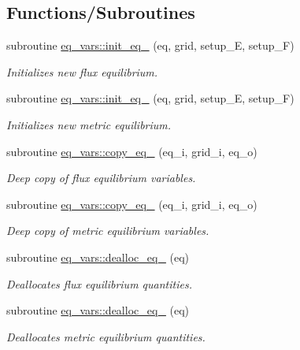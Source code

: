 \subsection*{Functions/\+Subroutines}
\begin{DoxyCompactItemize}
\item 
subroutine \hyperlink{namespaceeq__vars_a0270785c6b513c53e6d7c837f38f377b}{eq\+\_\+vars\+::init\+\_\+eq\+\_} (eq, grid, setup\+\_\+E, setup\+\_\+F)
\begin{DoxyCompactList}\small\item\em Initializes new flux equilibrium. \end{DoxyCompactList}\item 
subroutine \hyperlink{namespaceeq__vars_a93947b772250ef73b25bde7688b33bc2}{eq\+\_\+vars\+::init\+\_\+eq\+\_} (eq, grid, setup\+\_\+E, setup\+\_\+F)
\begin{DoxyCompactList}\small\item\em Initializes new metric equilibrium. \end{DoxyCompactList}\item 
subroutine \hyperlink{namespaceeq__vars_aa781ffa18b6b17905e126871c43d3267}{eq\+\_\+vars\+::copy\+\_\+eq\+\_} (eq\+\_\+i, grid\+\_\+i, eq\+\_\+o)
\begin{DoxyCompactList}\small\item\em Deep copy of flux equilibrium variables. \end{DoxyCompactList}\item 
subroutine \hyperlink{namespaceeq__vars_a50561f7dcd43970bd16a31cd87714c12}{eq\+\_\+vars\+::copy\+\_\+eq\+\_} (eq\+\_\+i, grid\+\_\+i, eq\+\_\+o)
\begin{DoxyCompactList}\small\item\em Deep copy of metric equilibrium variables. \end{DoxyCompactList}\item 
subroutine \hyperlink{namespaceeq__vars_ab106dc007ddc896092d0464233b3ce12}{eq\+\_\+vars\+::dealloc\+\_\+eq\+\_} (eq)
\begin{DoxyCompactList}\small\item\em Deallocates flux equilibrium quantities. \end{DoxyCompactList}\item 
subroutine \hyperlink{namespaceeq__vars_a206698a627df7d8285921ee4a9f75c11}{eq\+\_\+vars\+::dealloc\+\_\+eq\+\_} (eq)
\begin{DoxyCompactList}\small\item\em Deallocates metric equilibrium quantities. \end{DoxyCompactList}\end{DoxyCompactItemize}
